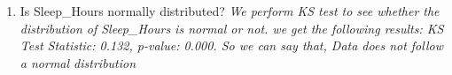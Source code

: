 \documentclass{article}
\begin{document}
\begin{enumerate}
\begin{enumerate}[label= \alph*]
        \item Is Sleep\_Hours normally distributed? 
        \textit{We perform KS test to see whether the distribution of Sleep\_Hours is normal or not. we get the following results: KS Test Statistic: 0.132, p-value: 0.000. So we can say that, Data does not follow a normal distribution}
    
    \end{enumerate}

\end{enumerate}
\end{document}
